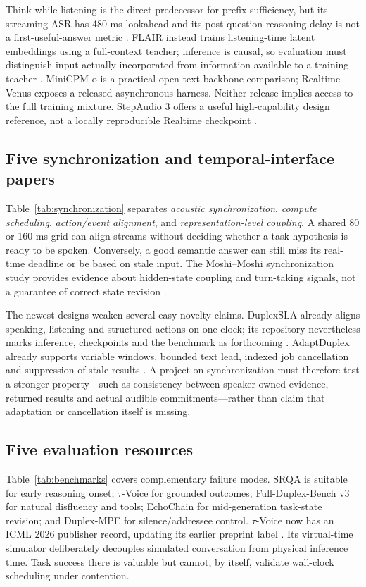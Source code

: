 \documentclass{article}
\begin{document}
Think while listening is the direct predecessor for prefix sufficiency, but its streaming ASR has 480 ms lookahead and its post-question reasoning delay is not a first-useful-answer metric \citep{thinklisten}. FLAIR instead trains listening-time latent embeddings using a full-context teacher; inference is causal, so evaluation must distinguish input actually incorporated from information available to a training teacher \citep{flair}. MiniCPM-o is a practical open text-backbone comparison; Realtime-Venus exposes a released asynchronous harness. Neither release implies access to the full training mixture. StepAudio 3 offers a useful high-capability design reference, not a locally reproducible Realtime checkpoint \citep{minicpm,venus,step3}.

\subsection{Five synchronization and temporal-interface papers}

Table~\ref{tab:synchronization} separates \emph{acoustic synchronization}, \emph{compute scheduling}, \emph{action/event alignment}, and \emph{representation-level coupling}. A shared 80 or 160 ms grid can align streams without deciding whether a task hypothesis is ready to be spoken. Conversely, a good semantic answer can still miss its real-time deadline or be based on stale input. The Moshi--Moshi synchronization study provides evidence about hidden-state coupling and turn-taking signals, not a guarantee of correct state revision \citep{synchrony}.

The newest designs weaken several easy novelty claims. DuplexSLA already aligns speaking, listening and structured actions on one clock; its repository nevertheless marks inference, checkpoints and the benchmark as forthcoming \citep{duplexsla}. AdaptDuplex already supports variable windows, bounded text lead, indexed job cancellation and suppression of stale results \citep{adapt}. A project on synchronization must therefore test a stronger property---such as consistency between speaker-owned evidence, returned results and actual audible commitments---rather than claim that adaptation or cancellation itself is missing.

\subsection{Five evaluation resources}

Table~\ref{tab:benchmarks} covers complementary failure modes. SRQA is suitable for early reasoning onset; $\tau$-Voice for grounded outcomes; Full-Duplex-Bench v3 for natural disfluency and tools; EchoChain for mid-generation task-state revision; and Duplex-MPE for silence/addressee control. $\tau$-Voice now has an ICML 2026 publisher record, updating its earlier preprint label \citep{tauvoice}. Its virtual-time simulator deliberately decouples simulated conversation from physical inference time. Task success there is valuable but cannot, by itself, validate wall-clock scheduling under contention.
\end{document}
